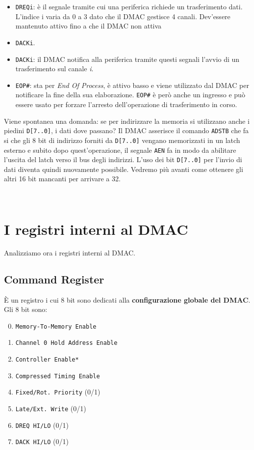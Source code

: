 \documentclass[11pt]{book}
\begin{document}
\begin{itemize}
\item {\tt DREQi}: \`e il segnale tramite cui una periferica richiede
  un trasferimento dati. L'indice i varia da 0 a 3 dato che il DMAC
  gestisce 4 canali. Dev'essere mantenuto attivo fino a che il DMAC
  non attiva \item {\tt DACKi}.
\item {\tt DACKi}: il DMAC notifica alla periferica tramite questi
  segnali l'avvio di un trasferimento sul canale \textit{i}.
\item {\tt EOP\#}: sta per \textit{End Of Process}, \`e attivo basso e
  viene utilizzato dal DMAC per notificare la fine della sua
  elaborazione. {\tt EOP\#} \`e per\`o anche un ingresso e pu\`o
  essere usato per forzare l'arresto dell'operazione di trasferimento
  in corso.
\end{itemize}

Viene spontanea una domanda: se per indirizzare la memoria si
utilizzano anche i piedini \texttt{D[7..0]}, i dati dove passano? Il
DMAC asserisce il comando \texttt{ADSTB} che fa si che gli 8 bit di
indirizzo forniti da \texttt{D[7..0]} vengano memorizzati in un latch
esterno e subito dopo quest'operazione, il segnale \texttt{AEN} fa in
modo da abilitare l'uscita del latch verso il bus degli
indirizzi. L'uso dei bit \texttt{D[7..0]} per l'invio di dati diventa
quindi nuovamente possibile. Vedremo pi\`u avanti come ottenere gli
altri 16 bit mancanti per arrivare a 32.

\

\section{I registri interni al DMAC}

Analizziamo ora i registri interni al DMAC.

\subsection{Command Register}

\`E un registro i cui 8 bit sono dedicati alla \textbf{configurazione
  globale del DMAC}. Gli 8 bit sono:

\begin{enumerate}
\setcounter{enumi}{-1}
\item \texttt{Memory-To-Memory Enable}
\item \texttt{Channel 0 Hold Address Enable}
\item \texttt{Controller Enable*}
\item \texttt{Compressed Timing Enable}
\item \texttt{Fixed/Rot. Priority} (0/1)
\item \texttt{Late/Ext. Write} (0/1)
\item \texttt{DREQ HI/LO} (0/1)
\item \texttt{DACK HI/LO} (0/1)
\end{enumerate}
\end{document}
